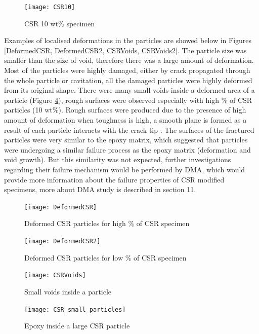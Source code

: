 \documentclass[numbers=noendperiod,chapterprefix=on]{icldt} %
\begin{document}
{\begin{figure}[!htpb]
\centering
\texttt{[image: CSR10]}
\caption{CSR 10 wt\% specimen} \label{CSR10}
\end{figure}
\FloatBarrier

Examples of localised deformations in the particles are showed below in Figures \ref{DeformedCSR, DeformedCSR2, CSRVoids, CSRVoids2}. The particle size was smaller than the size of void, therefore there was a large amount of deformation. Most of the particles were highly damaged, either by crack propagated through the whole particle or cavitation, all the damaged particles were highly deformed from its original shape. There were many small voids inside a deformed area of a particle (Figure \ref{CSRVoids}), rough surfaces were observed especially with high \% of CSR particles (10 wt\%). Rough surfaces were produced due to the presence of high amount of deformation when toughness is high, a smooth plane is formed as a result of each particle interacts with the crack tip \cite{Bray2013}. The surfaces of the fractured particles were very similar to the epoxy matrix, which suggested that particles were undergoing a similar failure process as the epoxy matrix (deformation and void growth). But this similarity was not expected, further investigations regarding their failure mechanism would be performed by DMA, which would provide more information about the failure properties of CSR modified specimens, more about DMA study is described in section 11.

\begin{figure}[!htpb]
\centering
\texttt{[image: DeformedCSR]}
\caption{Deformed CSR particles for high \% of CSR specimen }\label{DeformedCSR}
\end{figure}
\FloatBarrier

\begin{figure}[!htpb]
\centering
\texttt{[image: DeformedCSR2]}
\caption{Deformed CSR particles for low \% of CSR specimen }\label{DeformedCSR2}
\end{figure}
\FloatBarrier

\begin{figure}[!htpb]
\centering
\texttt{[image: CSRVoids]}
\caption{Small voids inside a particle}\label{CSRVoids}
\end{figure}
\FloatBarrier

\begin{figure}[!htpb]
\centering
\texttt{[image: CSR\_small\_particles]}
\caption{Epoxy inside a large CSR particle}\label{CSR_small_particles}
\end{figure}
\FloatBarrier

}
\end{document}
